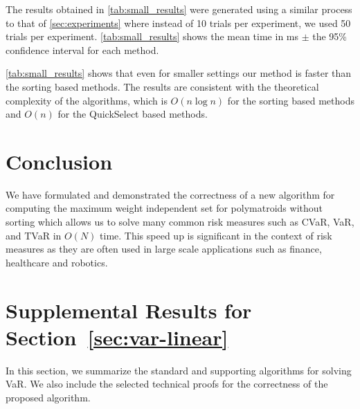 \documentclass[10pt]{article} %
\begin{document}
The results obtained in \cref{tab:small_results} were generated using a similar process to that of \cref{sec:experiments} where instead of 10 trials per experiment, we used 50 trials per experiment. \cref{tab:small_results} shows the mean time in ms $\pm$ the 95\% confidence interval for each method.

\cref{tab:small_results} shows that even for smaller settings our method is faster than the sorting based methods. The results are consistent with the theoretical complexity of the algorithms, which is $O(n \log n)$ for the sorting based methods and $O(n)$ for the QuickSelect based methods.



\section{Conclusion}

We have formulated and demonstrated the correctness of a new algorithm for computing the maximum weight independent set for polymatroids without sorting which allows us to solve many common risk measures such as CVaR, VaR, and TVaR in $O(N)$ time.
This speed up is significant in the context of risk measures as they are often used in large scale applications such as finance, healthcare and robotics.



\appendix
{}


\section{Supplemental Results for Section~\ref{sec:var-linear}} \label{sec:stand-var-algor}

In this section, we summarize the standard and supporting algorithms for solving VaR. We also include the selected technical proofs for the correctness of the proposed algorithm. 
\end{document}
